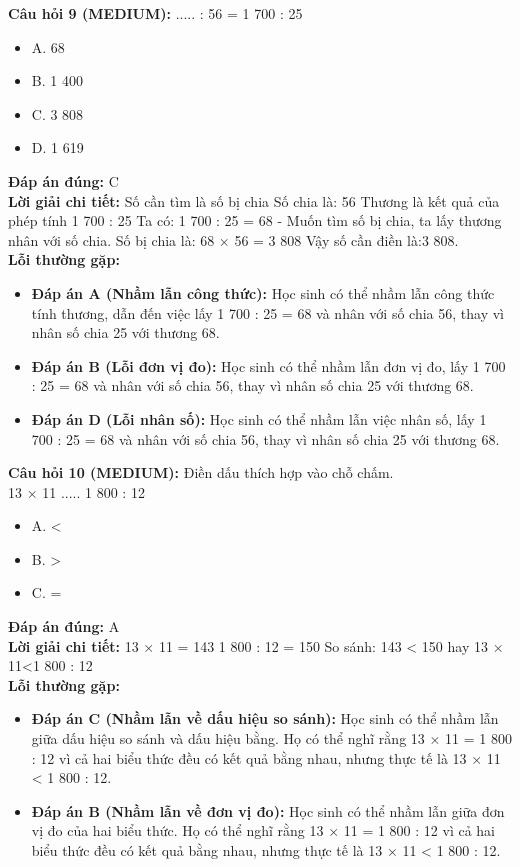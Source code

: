 \documentclass{article}
\begin{document}
\begin{minipage}{\textwidth}
\noindent\textbf{Câu hỏi 9 (MEDIUM):} ..... : 56 = 1 700 : 25 
\begin{itemize}[label={}]
    \item A. 68
    \item B. 1 400
    \item C. 3 808
    \item D. 1 619
\end{itemize}
\textbf{Đáp án đúng:} C \\
\textbf{Lời giải chi tiết:} Số cần tìm là số bị chia Số chia là: 56 Thương là kết quả của phép tính 1 700 : 25 Ta có: 1 700 : 25 = 68 - Muốn tìm số bị chia, ta lấy thương nhân với số chia. Số bị chia là: 68 × 56 = 3 808 Vậy số cần điền là:3 808. \\
\textbf{Lỗi thường gặp:}
\begin{itemize}
  \item \textbf{Đáp án A (Nhầm lẫn công thức):} Học sinh có thể nhầm lẫn công thức tính thương, dẫn đến việc lấy 1 700 : 25 = 68 và nhân với số chia 56, thay vì nhân số chia 25 với thương 68.
  \item \textbf{Đáp án B (Lỗi đơn vị đo):} Học sinh có thể nhầm lẫn đơn vị đo, lấy 1 700 : 25 = 68 và nhân với số chia 56, thay vì nhân số chia 25 với thương 68.
  \item \textbf{Đáp án D (Lỗi nhân số):} Học sinh có thể nhầm lẫn việc nhân số, lấy 1 700 : 25 = 68 và nhân với số chia 56, thay vì nhân số chia 25 với thương 68.
\end{itemize}
\end{minipage}
\vspace{1em}

\begin{minipage}{\textwidth}
\noindent\textbf{Câu hỏi 10 (MEDIUM):} Điền dấu thích hợp vào chỗ chấm. \\
13 × 11 ..... 1 800 : 12 
\begin{itemize}[label={}]
    \item A. <
    \item B. >
    \item C. =
\end{itemize}
\textbf{Đáp án đúng:} A \\
\textbf{Lời giải chi tiết:} 13 × 11 = 143 1 800 : 12 = 150 So sánh: 143 < 150 hay 13 × 11<1 800 : 12 \\
\textbf{Lỗi thường gặp:}
\begin{itemize}
  \item \textbf{Đáp án C (Nhầm lẫn về dấu hiệu so sánh):} Học sinh có thể nhầm lẫn giữa dấu hiệu so sánh và dấu hiệu bằng. Họ có thể nghĩ rằng 13 × 11 = 1 800 : 12 vì cả hai biểu thức đều có kết quả bằng nhau, nhưng thực tế là 13 × 11 < 1 800 : 12.
  \item \textbf{Đáp án B (Nhầm lẫn về đơn vị đo):} Học sinh có thể nhầm lẫn giữa đơn vị đo của hai biểu thức. Họ có thể nghĩ rằng 13 × 11 = 1 800 : 12 vì cả hai biểu thức đều có kết quả bằng nhau, nhưng thực tế là 13 × 11 < 1 800 : 12.
\end{itemize}
\end{minipage}
\vspace{1em}
\end{document}
